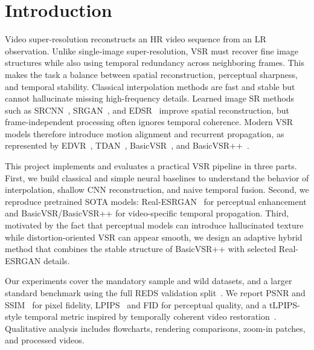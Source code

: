 \section{Introduction}
Video super-resolution reconstructs an HR video sequence from an LR observation. Unlike single-image super-resolution, VSR must recover fine image structures while also using temporal redundancy across neighboring frames. This makes the task a balance between spatial reconstruction, perceptual sharpness, and temporal stability. Classical interpolation methods are fast and stable but cannot hallucinate missing high-frequency details. Learned image SR methods such as SRCNN~\cite{dong2015srcnn}, SRGAN~\cite{ledig2017srgan}, and EDSR~\cite{lim2017edsr} improve spatial reconstruction, but frame-independent processing often ignores temporal coherence. Modern VSR models therefore introduce motion alignment and recurrent propagation, as represented by EDVR~\cite{wang2019edvr}, TDAN~\cite{tian2020tdan}, BasicVSR~\cite{chan2021basicvsr}, and BasicVSR++~\cite{chan2022basicvsrpp}.

This project implements and evaluates a practical VSR pipeline in three parts. First, we build classical and simple neural baselines to understand the behavior of interpolation, shallow CNN reconstruction, and naive temporal fusion. Second, we reproduce pretrained SOTA models: Real-ESRGAN~\cite{wang2021realesrgan} for perceptual enhancement and BasicVSR/BasicVSR++ for video-specific temporal propagation. Third, motivated by the fact that perceptual models can introduce hallucinated texture while distortion-oriented VSR can appear smooth, we design an adaptive hybrid method that combines the stable structure of BasicVSR++ with selected Real-ESRGAN details.

Our experiments cover the mandatory sample and wild datasets, and a larger standard benchmark using the full REDS validation split~\cite{nah2019reds}. We report PSNR and SSIM~\cite{wang2004ssim} for pixel fidelity, LPIPS~\cite{zhang2018lpips} and FID for perceptual quality, and a tLPIPS-style temporal metric inspired by temporally coherent video restoration~\cite{chu2020tlpips}. Qualitative analysis includes flowcharts, rendering comparisons, zoom-in patches, and processed videos.

